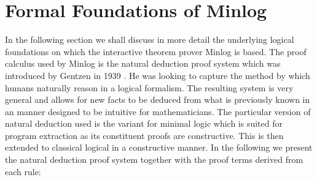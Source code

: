 \section{Formal Foundations of Minlog}
In the following section we shall discuss in more detail the underlying logical foundations on which the interactive theorem prover Minlog is based. The proof calculus used by Minlog is the natural deduction proof system which was introduced by Gentzen in 1939 \cite{GG69}. He was looking to capture the method by which humans naturally reason in a logical formalism.  The resulting system is very general and allows for new facts to be deduced from what is previously known in an manner designed to be intuitive for mathematicians.  The particular version of natural deduction used is the variant for minimal logic which is suited for program extraction as its constituent proofs are constructive. This is then extended to classical logical in a constructive manner. In the following we present the natural deduction proof system together with the proof terms derived from each rule:  \medskip
%
